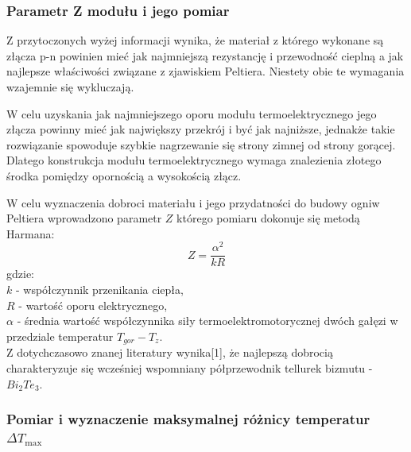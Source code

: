 \documentclass[oneside]{mgr}
\begin{document}
\subsubsection{Parametr Z modułu i jego pomiar}
Z przytoczonych wyżej informacji wynika, że materiał z którego wykonane są złącza p-n powinien mieć jak najmniejszą rezystancję i przewodność cieplną a jak najlepsze właściwości związane z zjawiskiem Peltiera. Niestety obie te wymagania wzajemnie się wykluczają.

W celu uzyskania jak najmniejszego oporu modułu termoelektrycznego jego złącza powinny mieć jak największy przekrój i być jak najniższe, jednakże takie rozwiązanie spowoduje szybkie nagrzewanie się strony zimnej od strony gorącej. Dlatego konstrukcja modułu termoelektrycznego wymaga znalezienia złotego środka pomiędzy opornością a wysokością złącz.

W celu wyznaczenia dobroci materiału i jego przydatności do budowy ogniw Peltiera wprowadzono parametr $Z$ którego pomiaru dokonuje się metodą Harmana:
\begin{equation}
    Z = \frac{\alpha^2}{kR}
\end{equation}
gdzie: \\
$k$ - współczynnik przenikania ciepła, \\
$R$ - wartość oporu elektrycznego, \\
$\alpha$ - średnia wartość współczynnika siły termoelektromotorycznej dwóch gałęzi w przedziale temperatur $T_{gor}-T_z$. \\

Z dotychczasowo znanej literatury wynika[1], że najlepszą dobrocią charakteryzuje się wcześniej wspomniany półprzewodnik tellurek bizmutu - $Bi_2 Te_3$.

\subsubsection{Pomiar i wyznaczenie maksymalnej różnicy temperatur $\Delta T_{\max}$}
\end{document}
